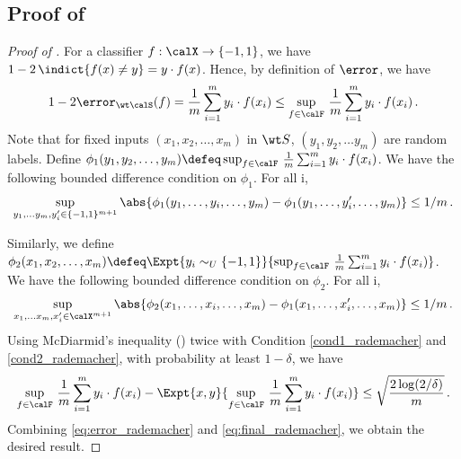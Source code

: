 \subsection{Proof of }

\begin{proof}[Proof of ]
    For a classifier $ f: \calX \to \{-1, 1\}$, we have $1 - 2\,\indict{ f(x) \ne y} = y \cdot f(x)$. Hence, by definition of $\error$, we have 
    \begin{align}
        1 -2\error_{\wt \calS}(f) = \frac{1}{m}\sum_{i=1}^m y_i \cdot f(x_i) \le \sup_{f \in \calF} \, \frac{1}{m} \sum_{i=1}^m y_i \cdot f(x_i)  \,. \label{eq:error_rademacher}
    \end{align}
    Note that for fixed inputs $(x_1, x_2, \ldots, x_m)$ in $\wt S$, $(y_1, y_2, \ldots y_m)$ are random labels. Define $\phi_1 (y_1, y_2, \ldots, y_m) \defeq \sup_{f \in \calF} \, \frac{1}{m} \sum_{i=1}^m y_i \cdot f(x_i)$. We have the following bounded difference condition on $\phi_1$. For all i, 
    \begin{align}
        \sup_{y_1, \ldots y_m, y_i^\prime \in \{-1, 1\}^{m+1} } \abs{ \phi_1 (y_1,\ldots, y_i, \ldots, y_m) - \phi_1 (y_1,\ldots, y_i^\prime, \ldots, y_m)  } \le 1/m \,. \label{cond1_rademacher}
    \end{align} 
    
    Similarly, we define $\phi_2 (x_1, x_2, \ldots, x_m) \defeq \Expt{ y_i \sim_U \{-1, 1\}  }{ \sup_{f \in \calF} \, \frac{1}{m}  \sum_{i=1}^m y_i \cdot f(x_i)}$. We have the following bounded difference condition on $\phi_2$. 
    For all i,
    \begin{align}
        \sup_{x_1, \ldots x_m, x_i^\prime \in \calX^{m+1} } \abs{ \phi_2 (x_1,\ldots, x_i, \ldots, x_m) - \phi_1 (x_1,\ldots, x_i^\prime, \ldots, x_m)  } \le 1/m \,. \label{cond2_rademacher}
    \end{align}
    Using McDiarmid’s inequality () twice 
    with Condition \eqref{cond1_rademacher} and \eqref{cond2_rademacher}, 
    with probability at least $1-\delta$, we have
    \begin{align}
        \sup_{f \in \calF} \, \frac{1}{m} \sum_{i=1}^m y_i \cdot f(x_i)  - \Expt{x,y}{\sup_{f \in \calF} \, \frac{1}{m} \sum_{i=1}^m y_i \cdot f(x_i) } \le \sqrt{\frac{2\log(2/\delta)}{m}} \,. \label{eq:final_rademacher}
    \end{align} 
    Combining \eqref{eq:error_rademacher} and \eqref{eq:final_rademacher}, we obtain the desired result. 
\end{proof}



